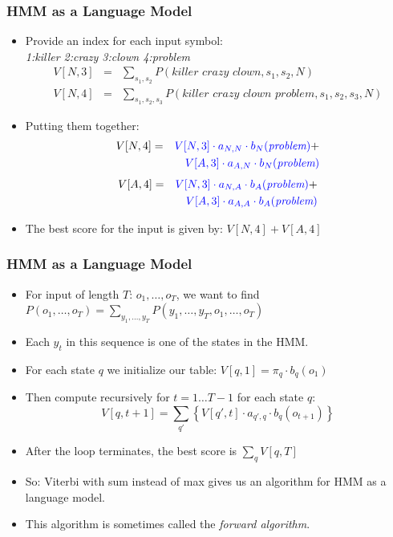 \begin{frame}
\frametitle{HMM as a Language Model}
\begin{itemize}[<+->]
\item Provide an index for each input symbol:\\
 {\it 1:killer 2:crazy 3:clown 4:problem} 
\begin{eqnarray*}
V[N, 3] &=& \sum_{s_1, s_2} P(\textit{killer crazy clown}, s_1, s_2, N) \\
V[N, 4] &=& \sum_{s_1, s_2, s_3} P(\textit{killer crazy clown problem}, s_1, s_2, s_3, N)
\end{eqnarray*}

\item Putting them together:
\begin{eqnarray*}
V[N,4] &=& {\color{blue} V[N,3] \cdot a_{N,N} \cdot b_N(\textit{problem}) } +\\
&& {\color{blue} V[A,3] \cdot a_{A,N} \cdot b_N(\textit{problem}) }
\end{eqnarray*}
\begin{eqnarray*}
V[A,4] &=& {\color{blue} V[N,3] \cdot a_{N,A} \cdot b_A(\textit{problem}) } +\\
&& {\color{blue} V[A,3] \cdot a_{A,A} \cdot b_A(\textit{problem}) }
\end{eqnarray*}
\item The best score for the input is given by:
\( V[N,4] + V[A,4] \)
\end{itemize}
\end{frame}

\begin{frame}
\frametitle{HMM as a Language Model}
\begin{itemize}[<+->]
\item For input of length $T$: $o_1, \ldots, o_T$, we want to find $P(o_1, \ldots, o_T) = \sum_{y_1, \ldots, y_T} P(y_1, \ldots, y_T, o_1, \ldots, o_T)$ 
\item Each $y_t$ in this sequence is one of the states in the HMM.
\item For each state $q$ we initialize our table: $V[q,1] = \pi_q \cdot b_q(o_1)$ 
\item Then compute recursively for $t = 1 \ldots T-1$ for each state $q$:
\[ V[q, t+1] = \sum_{q'} \left\{ V[q', t] \cdot a_{q',q} \cdot b_q(o_{t+1}) \right\} \]
\item After the loop terminates, the best score is $\sum_q V[q,T]$
\item So: Viterbi with sum instead of max gives us an algorithm for HMM as a language model.
\item This algorithm is sometimes called the \emph{forward algorithm}.
\end{itemize}
\end{frame}

